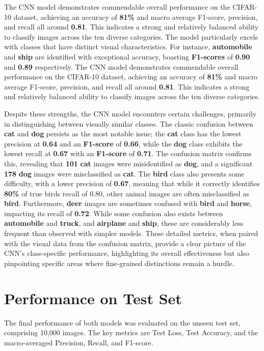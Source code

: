\documentclass[12pt, a4paper]{report}
\begin{document}
The CNN model demonstrates commendable overall performance on the CIFAR-10 dataset, achieving an accuracy of \textbf{81\%} and macro average F1-score, precision, and recall all around \textbf{0.81}.
This indicates a strong and relatively balanced ability to classify images across the ten diverse categories.
The model particularly excels with classes that have distinct visual characteristics.
For instance, \textbf{automobile} and \textbf{ship} are identified with exceptional accuracy, boasting \textbf{F1-scores} of \textbf{0.90} and \textbf{0.89} respectively.
The CNN model demonstrates commendable overall performance on the CIFAR-10 dataset, achieving an accuracy of \textbf{81\%} and macro average F1-score, precision, and recall all around \textbf{0.81}.
This indicates a strong and relatively balanced ability to classify images across the ten diverse categories.

Despite these strengths, the CNN model encounters certain challenges, primarily in distinguishing between visually similar classes.
The classic confusion between \textbf{cat} and \textbf{dog} persists as the most notable issue;
the \textbf{cat} class has the lowest precision at \textbf{0.64} and an \textbf{F1-score} of \textbf{0.66}, while the \textbf{dog} class exhibits the lowest recall at \textbf{0.67} with an \textbf{F1-score} of \textbf{0.71}.
The confusion matrix confirms this, revealing that \textbf{101} \textbf{cat} images were misidentified as \textbf{dog}, and a significant \textbf{178} \textbf{dog} images were misclassified as \textbf{cat}.
The \textbf{bird} class also presents some difficulty, with a lower precision of \textbf{0.67}, meaning that while it correctly identifies \textbf{80\%} of true birds recall of 0.80, other animal images are often misclassified as \textbf{bird}.
Furthermore, \textbf{deer} images are sometimes confused with \textbf{bird} and \textbf{horse}, impacting its recall of \textbf{0.72}.
While some confusion also exists between \textbf{automobile} and \textbf{truck}, and \textbf{airplane} and \textbf{ship}, these are considerably less frequent than observed with simpler models.
These detailed metrics, when paired with the visual data from the confusion matrix, provide a clear picture of the CNN's class-specific performance, highlighting its overall effectiveness but also pinpointing specific areas where fine-grained distinctions remain a hurdle.

\section{Performance on Test Set}
The final performance of both models was evaluated on the unseen test set, comprising 10,000 images.
The key metrics are Test Loss, Test Accuracy, and the macro-averaged Precision, Recall, and F1-score.
\end{document}
